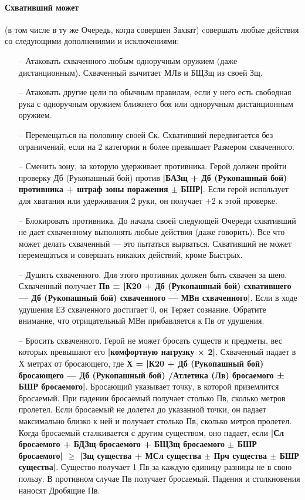 \paragraph{Схвативший может} (в том числе в ту же Очередь, когда совершен Захват) cовершать любые действия со следующими дополнениями и исключениями:
\begin{itemize}
\item[--] Атаковать схваченного любым одноручным оружием (даже дистанционным). Схваченный вычитает МЛв и БЩЗщ из своей Зщ.
\item[--] Атаковать другие цели по обычным правилам, если у него есть свободная рука с одноручным оружием ближнего боя или одноручным дистанционным оружием.
\item[--] Перемещаться на половину своей Ск. Схвативший передвигается без ограничений, если на 2 категории и более превышает Размером схваченного.
\item[--] Сменить зону, за которую удерживает противника. Герой должен пройти проверку Дб (Рукопашный бой) против \textbf{|БАЗщ + Дб (Рукопашный бой) противника + штраф зоны поражения $\pm$ БШР|}. Если герой использует для хватания или удерживания 2 руки, он получает +2 к этой проверке.
\item[--] Блокировать противника. До начала своей следующей Очереди схвативший не дает схваченному выполнять любые действия (даже говорить). Все что может делать схваченный — это пытаться вырваться. Схвативший не может перемещаться и совершать никаких действий, кроме Быстрых.
\item[--] Душить схваченного. Для этого противник должен быть схвачен за шею. Схваченный получает \textbf{Пв = |К20 + Дб (Рукопашный бой) схватившего — Дб (Рукопашный бой) схваченного — МВн схваченного|}. Если в ходе удушения ЕЗ схваченного достигает 0, он Теряет сознание. Обратите внимание, что отрицательный МВн прибавляется к Пв от удушения.
\item[--] Бросить схваченного. Герой не может бросать существ и предметы, вес которых превышают его \textbf{|комфортную нагрузку × 2|}. Схваченный падает в Х метрах от бросающего, где \textbf{Х = |К20 + Дб (Рукопашный бой) бросающего — Дб (Рукопашный бой) /Атлетика (Лв) бросаемого ± БШР бросаемого|}. Бросающий указывает точку, в которой приземлится бросаемый. При падении бросаемый получает столько Пв, сколько метров пролетел. Если бросаемый не долетел до указанной точки, он падает максимально близко к ней и получает столько Пв, сколько метров пролетел. Когда бросаемый сталкивается с другим существом, оно падает, если \textbf{|Сл бросаемого + БДЗщ бросаемого + БЩЗщ бросаемого $\pm$ БШР бросаемого| $\ge$ |Зщ существа + МСл существа $\pm$ Прч существа $\pm$ БШР существа|}. Существо получает 1 Пв за каждую единицу разницы не в свою пользу. В противном случае Пв получает бросаемый. Падения и столкновения наносят Дробящие Пв.

\end{itemize}
